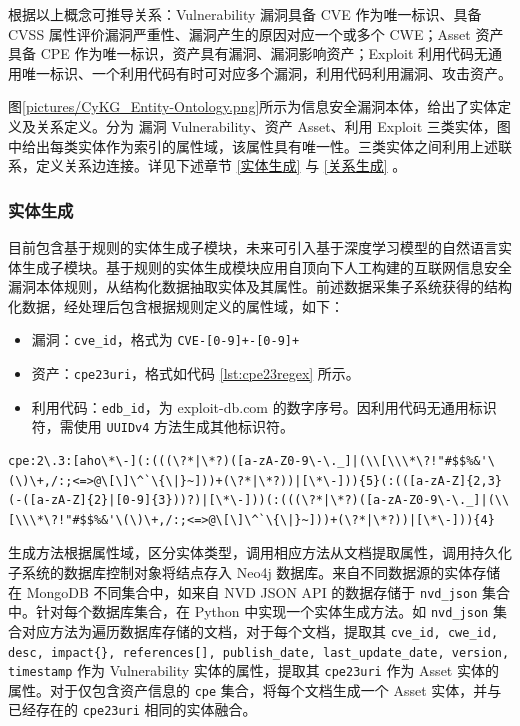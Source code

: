 \documentclass[a4paper,AutoFakeBold,oneside,12pt]{book}
\begin{document}
根据以上概念可推导关系：Vulnerability 漏洞具备 CVE 作为唯一标识、具备 CVSS 属性评价漏洞严重性、漏洞产生的原因对应一个或多个 CWE；Asset 资产具备 CPE 作为唯一标识，资产具有漏洞、漏洞影响资产；Exploit 利用代码无通用唯一标识、一个利用代码有时可对应多个漏洞，利用代码利用漏洞、攻击资产。

图\ref{pictures/CyKG_Entity-Ontology.png}所示为信息安全漏洞本体，给出了实体定义及关系定义。分为  漏洞 Vulnerability、资产 Asset、利用 Exploit 三类实体，图中给出每类实体作为索引的属性域，该属性具有唯一性。三类实体之间利用上述联系，定义关系边连接。详见下述章节 \ref{实体生成} 与 \ref{关系生成} 。


\subsubsection{实体生成\label{实体生成}}

目前包含基于规则的实体生成子模块，未来可引入基于深度学习模型的自然语言实体生成子模块。基于规则的实体生成模块应用自顶向下人工构建的互联网信息安全漏洞本体规则，从结构化数据抽取实体及其属性。前述数据采集子系统获得的结构化数据，经处理后包含根据规则定义的属性域，如下：
\begin{itemize}
	\item 漏洞：\lstinline|cve_id|，格式为 \lstinline|CVE-[0-9]+-[0-9]+|
	\item 资产：\lstinline|cpe23uri|，格式如代码 \ref{lst:cpe23regex} 所示。
	\item 利用代码：\lstinline|edb_id|，为 exploit-db.com 的数字序号。因利用代码无通用标识符，需使用 \lstinline|UUIDv4| 方法生成其他标识符。
\end{itemize}

\begin{lstlisting}[caption={CPE 2.3 格式正则表达式},label={lst:cpe23regex},breaklines,style=lgeneral]
	cpe:2\.3:[aho\*\-](:(((\?*|\*?)([a-zA-Z0-9\-\._]|(\\[\\\*\?!"#$$%&'\(\)\+,/:;<=>@\[\]\^`\{\|}~]))+(\?*|\*?))|[\*\-])){5}(:(([a-zA-Z]{2,3}(-([a-zA-Z]{2}|[0-9]{3}))?)|[\*\-]))(:(((\?*|\*?)([a-zA-Z0-9\-\._]|(\\[\\\*\?!"#$$%&'\(\)\+,/:;<=>@\[\]\^`\{\|}~]))+(\?*|\*?))|[\*\-])){4}
\end{lstlisting}

生成方法根据属性域，区分实体类型，调用相应方法从文档提取属性，调用持久化子系统的数据库控制对象将结点存入 Neo4j 数据库。来自不同数据源的实体存储在 MongoDB 不同集合中，如来自 NVD JSON API 的数据存储于 \lstinline|nvd_json| 集合中。针对每个数据库集合，在 Python 中实现一个实体生成方法。如 \lstinline|nvd_json| 集合对应方法为遍历数据库存储的文档，对于每个文档，提取其 \lstinline|cve_id, cwe_id, desc, impact{}, references[], publish_date, last_update_date, version, timestamp| 作为 Vulnerability 实体的属性，提取其 \lstinline|cpe23uri| 作为 Asset 实体的属性。对于仅包含资产信息的 \lstinline|cpe| 集合，将每个文档生成一个 Asset 实体，并与已经存在的 \lstinline|cpe23uri| 相同的实体融合。
\end{document}
